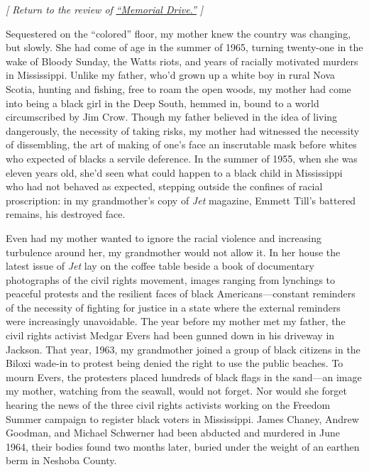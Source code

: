 \emph{{[} Return to the review of}
\href{https://www.nytimes.com/2020/07/30/books/review/memorial-drive-natastha-trethewey.html}{\emph{``Memorial
Drive.''}} \emph{{]}}

Sequestered on the ``colored'' floor, my mother knew the country was
changing, but slowly. She had come of age in the summer of 1965, turning
twenty-one in the wake of Bloody Sunday, the Watts riots, and years of
racially motivated murders in Mississippi. Unlike my father, who'd grown
up a white boy in rural Nova Scotia, hunting and fishing, free to roam
the open woods, my mother had come into being a black girl in the Deep
South, hemmed in, bound to a world circumscribed by Jim Crow. Though my
father believed in the idea of living dangerously, the necessity of
taking risks, my mother had witnessed the necessity of dissembling, the
art of making of one's face an inscrutable mask before whites who
expected of blacks a servile deference. In the summer of 1955, when she
was eleven years old, she'd seen what could happen to a black child in
Mississippi who had not behaved as expected, stepping outside the
confines of racial proscription: in my grandmother's copy of \emph{Jet}
magazine, Emmett Till's battered remains, his destroyed face.

Even had my mother wanted to ignore the racial violence and increasing
turbulence around her, my grandmother would not allow it. In her house
the latest issue of \emph{Jet} lay on the coffee table beside a book of
documentary photographs of the civil rights movement, images ranging
from lynchings to peaceful protests and the resilient faces of black
Americans---constant reminders of the necessity of fighting for justice
in a state where the external reminders were increasingly unavoidable.
The year before my mother met my father, the civil rights activist
Medgar Evers had been gunned down in his driveway in Jackson. That year,
1963, my grandmother joined a group of black citizens in the Biloxi
wade-in to protest being denied the right to use the public beaches. To
mourn Evers, the protesters placed hundreds of black flags in the
sand---an image my mother, watching from the seawall, would not forget.
Nor would she forget hearing the news of the three civil rights
activists working on the Freedom Summer campaign to register black
voters in Mississippi. James Chaney, Andrew Goodman, and Michael
Schwerner had been abducted and murdered in June 1964, their bodies
found two months later, buried under the weight of an earthen berm in
Neshoba County.

